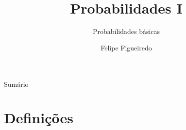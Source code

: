 \documentclass{beamer}
\title%
{Probabilidades I}
\subtitle
{Probabilidades básicas} %
\author%
{Felipe Figueiredo}%
\institute[INTO] %
{Instituto Nacional de Traumatologia e Ortopedia}
\date%
{}
\begin{document}
\begin{frame}
  \titlepage
\end{frame}

\begin{frame}{Sumário}
  \tableofcontents
\end{frame}









\section{Definições}
\end{document}

